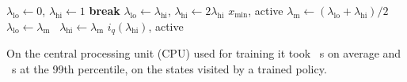 \begin{algorithm}[tbp]
\begin{algorithmic}[1]
\State $\lambda_{\mathrm{lo}}\gets0$, $\lambda_{\mathrm{hi}}\gets1$
   \textbf{break} \EndIf
  \State $\lambda_{\mathrm{lo}}\gets\lambda_{\mathrm{hi}}$, $\lambda_{\mathrm{hi}}\gets2\lambda_{\mathrm{hi}}$
\EndFor
{} \Return $x_{\min}$, active \EndIf
{}
  \State $\lambda_{\mathrm{m}}\gets(\lambda_{\mathrm{lo}}+\lambda_{\mathrm{hi}})/2$
   $\lambda_{\mathrm{lo}}\gets\lambda_{\mathrm{m}}$ \Else\ $\lambda_{\mathrm{hi}}\gets\lambda_{\mathrm{m}}$ \EndIf
\EndFor
\State \Return $i_q(\lambda_{\mathrm{hi}})$, active
\end{algorithmic}
\end{algorithm} On the central processing unit (CPU) used for training it took ~\textmu s on average and ~\textmu s at the 99th percentile, on the states visited by a trained policy.


